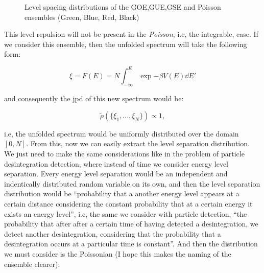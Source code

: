 \documentclass[11pt,a4paper]{article}
\begin{document}
\begin{figure}[ht]
    \centering
        \caption{Level spacing distributions of the GOE,GUE,GSE and Poisson ensembles (Green, Blue, Red, Black)}
\end{figure}

This level repulsion will not be present in the \textit{Poisson}, i.e, the integrable, case. If we consider this ensemble, then the unfolded spectrum will take the following form:

\begin{equation}
    \xi = F(E) = N \int_{-\infty}^E\exp{-\beta V(E)}\dd E'
\end{equation}

{\noindent and consequently the jpd of this new spectrum would be:}

\begin{equation}
    \widetilde{\rho}(\{\xi_1,...,\xi_N\}) \propto 1,
\end{equation}

{\noindent i.e, the unfolded spectrum would be uniformly distributed over the domain $[0,N]$. From this, now we can easily extract the level separation distribution. We just need to make the same considerations like in the problem of particle desintegration detection, where instead of time we consider energy level separation. Every energy level separation would be an independent and indentically distributed random variable on its own, and then the level separation distribution would be \textquotedblleft probability that a another energy level appears at a certain distance considering the constant probability that at a certain energy it exists an energy level\textquotedblright, i.e, the same we consider with particle detection, \textquotedblleft the probability that after after a certain time of having detected a desintegration, we detect another desintegration, considering that the probability that a desintegration occurs at a particular time is constant\textquotedblright. And then the distribution we must consider is the Poissonian (I hope this makes the naming of the ensemble clearer):}
\end{document}
